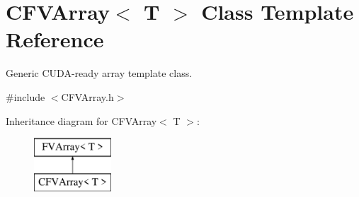\hypertarget{classFVL_1_1CFVArray}{
\section{CFVArray$<$ T $>$ Class Template Reference}
\label{dc/d80/classFVL_1_1CFVArray}
}


Generic CUDA-\/ready array template class.  




{\ttfamily \#include $<$CFVArray.h$>$}

Inheritance diagram for CFVArray$<$ T $>$:\begin{figure}[H]
\begin{center}
\leavevmode
\includegraphics[height=2.000000cm]{dc/d80/classFVL_1_1CFVArray}
\end{center}
\end{figure}
